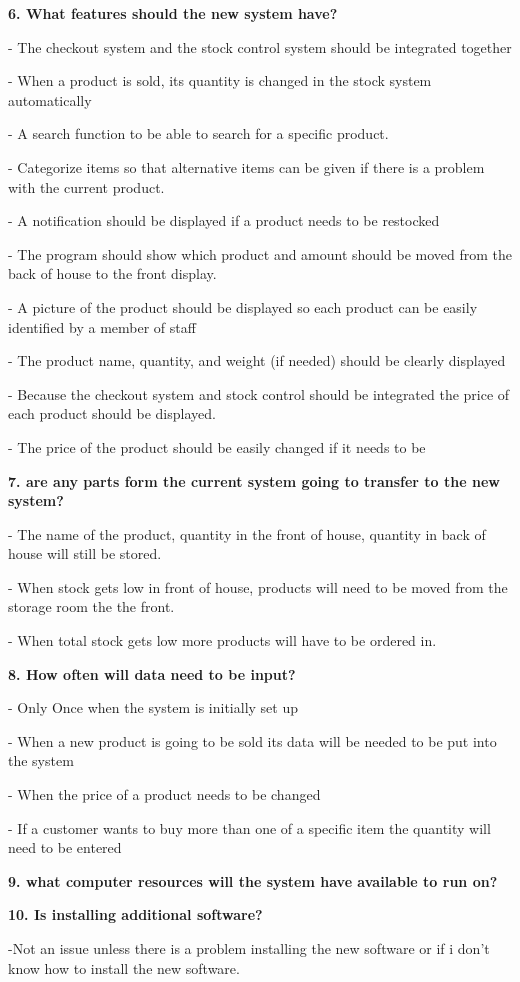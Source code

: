 \begin{flushleft}
\textbf{6. What features should the new system have?}\par
- The checkout system and the stock control system should be integrated together\par
- When a product is sold, its quantity is changed in the stock system automatically\par
- A search function to be able to search for a specific product.\par
- Categorize items so that alternative items can be given if there is a problem with the current product.\par
- A notification should be displayed if a product needs to be restocked\par
- The program should show which product and amount should be moved from the back of house to the front display.\par
- A picture of the product should be displayed so each product can be easily identified by a member of staff\par
- The product name, quantity, and weight (if needed) should be clearly displayed\par
- Because the checkout system and stock control should be integrated the price of each product should be displayed.\par
- The price of the product should be easily changed if it needs to be\par

\textbf{7. are any parts form the current system going to transfer to the new system?}\par
- The name of the product, quantity in the front of house, quantity in back of house will still be stored.\par
- When stock gets low in front of house, products will need to be moved from the storage room the the front.\par
- When total stock gets low more products will have to be ordered in.\par

\textbf{8. How often will data need to be input?}\par
- Only Once when the system is initially set up\par
- When a new product is going to be sold its data will be needed to be put into the system\par
- When the price of a product needs to be changed\par
- If a customer wants to buy more than one of a specific item the quantity will need to be entered\par

\textbf{9. what computer resources will the system have available to run on?}\par

\textbf{10. Is installing additional software?}\par
-Not an issue unless there is a problem installing the new software or  if i don't know how to install the new software.\par

	\end{flushleft}

